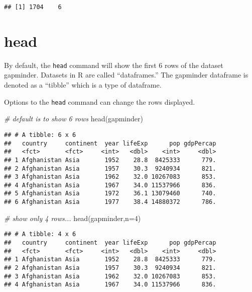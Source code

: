 \documentclass[
]{book}
\newenvironment{Shaded}{\begin{snugshade}}{\end{snugshade}}
\newcommand{\AttributeTok}[1]{\textcolor[rgb]{0.77,0.63,0.00}{#1}}
\newcommand{\CommentTok}[1]{\textcolor[rgb]{0.56,0.35,0.01}{\textit{#1}}}
\newcommand{\DecValTok}[1]{\textcolor[rgb]{0.00,0.00,0.81}{#1}}
\newcommand{\FunctionTok}[1]{\textcolor[rgb]{0.00,0.00,0.00}{#1}}
\newcommand{\NormalTok}[1]{#1}
\begin{document}
\begin{verbatim}
## [1] 1704    6
\end{verbatim}

\hypertarget{head}{%
\section{head}\label{head}}

By default, the \texttt{head} command will show the first 6 rows of the dataset gapminder. Datasets in R are called ``dataframes.'' The gapminder dataframe is denoted as a ``tibble'' which is a type of dataframe.

Options to the \texttt{head} command can change the rows displayed.

\begin{Shaded}
\begin{Highlighting}[]
\CommentTok{\# default is to show 6 rows}
\FunctionTok{head}\NormalTok{(gapminder)}
\end{Highlighting}
\end{Shaded}

\begin{verbatim}
## # A tibble: 6 x 6
##   country     continent  year lifeExp      pop gdpPercap
##   <fct>       <fct>     <int>   <dbl>    <int>     <dbl>
## 1 Afghanistan Asia       1952    28.8  8425333      779.
## 2 Afghanistan Asia       1957    30.3  9240934      821.
## 3 Afghanistan Asia       1962    32.0 10267083      853.
## 4 Afghanistan Asia       1967    34.0 11537966      836.
## 5 Afghanistan Asia       1972    36.1 13079460      740.
## 6 Afghanistan Asia       1977    38.4 14880372      786.
\end{verbatim}

\begin{Shaded}
\begin{Highlighting}[]
\CommentTok{\# show only 4 rows...}
\FunctionTok{head}\NormalTok{(gapminder,}\AttributeTok{n=}\DecValTok{4}\NormalTok{)}
\end{Highlighting}
\end{Shaded}

\begin{verbatim}
## # A tibble: 4 x 6
##   country     continent  year lifeExp      pop gdpPercap
##   <fct>       <fct>     <int>   <dbl>    <int>     <dbl>
## 1 Afghanistan Asia       1952    28.8  8425333      779.
## 2 Afghanistan Asia       1957    30.3  9240934      821.
## 3 Afghanistan Asia       1962    32.0 10267083      853.
## 4 Afghanistan Asia       1967    34.0 11537966      836.
\end{verbatim}
\end{document}
